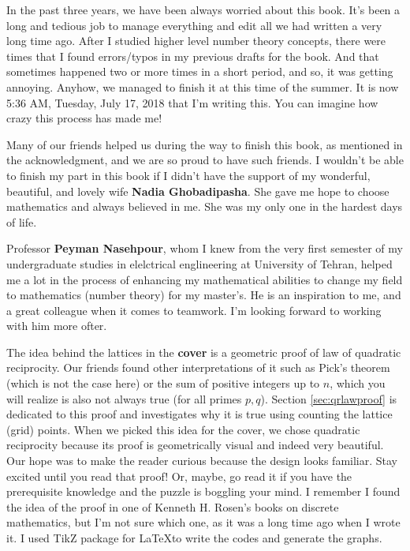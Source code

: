 \documentclass[12pt]{book}
\begin{document}
\newpage

In the past three years, we have been always worried about this book. It's been a long and tedious job to manage everything and edit all we had written a very long time ago. After I studied higher level number theory concepts, there were times that I found errors/typos in my previous drafts for the book. And that sometimes happened two or more times in a short period, and so, it was getting annoying. Anyhow, we managed to finish it at this time of the summer. It is now 5:36 AM, Tuesday, July 17, 2018 that I'm writing this. You can imagine how crazy this process has made me!

\vspace{0.3cm}
Many of our friends helped us during the way to finish this book, as mentioned in the acknowledgment, and we are so proud to have such friends. I wouldn't be able to finish my part in this book if I didn't have the support of my wonderful, beautiful, and lovely wife \textbf{Nadia Ghobadipasha}. She gave me hope to choose mathematics and always believed in me. She was my only one in the hardest days of life.

\vspace{0.3cm}

Professor \textbf{Peyman Nasehpour}, whom I knew from the very first semester of my undergraduate studies in elelctrical englineering at University of Tehran, helped me a lot in the process of enhancing my mathematical abilities to change my field to mathematics (number theory) for my master's.  He is an inspiration to me, and a great colleague when it comes to teamwork. I'm looking forward to working with him more ofter.

\vspace{0.3cm}

The idea behind the lattices in the \textbf{cover} is a geometric proof of law of quadratic reciprocity. Our friends found other interpretations of it such as Pick's theorem (which is not the case here) or the sum of positive integers up to $n$, which you will realize is also not always true (for all primes $p,q$). Section \eqref{sec:qrlawproof} is dedicated to this proof and investigates why it is true using counting the lattice (grid) points. When we picked this idea for the cover, we chose quadratic reciprocity because its proof is geometrically visual and indeed very beautiful. Our hope was to make the reader curious because the design looks familiar. Stay excited until you read that proof! Or, maybe, go read it if you have the prerequisite knowledge and the puzzle is boggling your mind. I remember I found the idea of the proof in one of Kenneth H. Rosen's books on discrete mathematics, but I'm not sure which one, as it was a long time ago when I wrote it. I used TikZ package for \LaTeX to write the codes and generate the graphs. 
\end{document}
